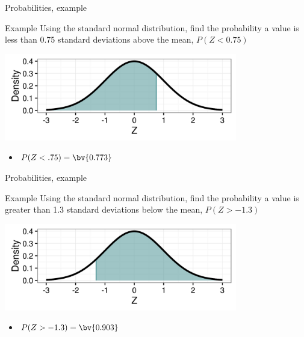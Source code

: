 \documentclass[xcolor=table]{beamer}
\begin{document}
\begin{frame}{Probabilities, example}
\begin{exampleblock}{Example}
Using the standard normal distribution, find the probability a value is less than 0.75 standard deviations above the mean, $P(Z < 0.75)$\\
\smallskip
{\centering
\includegraphics[width=4in]{../images/ch6_ex01}
\par}
\begin{itemize}
\pause\item $P(Z < .75) = \bv{0.773}$
\end{itemize}
\end{exampleblock}
\end{frame}

\begin{frame}{Probabilities, example}
\begin{exampleblock}{Example}
Using the standard normal distribution, find the probability a value is greater than 1.3 standard deviations below the mean, $P(Z > -1.3)$\\
\smallskip
{\centering
\includegraphics[width=4in]{../images/ch6_ex02}
\par}
\begin{itemize}
\pause\item $P(Z > -1.3) = \bv{0.903}$
\end{itemize}
\end{exampleblock}
\end{frame}
\end{document}

